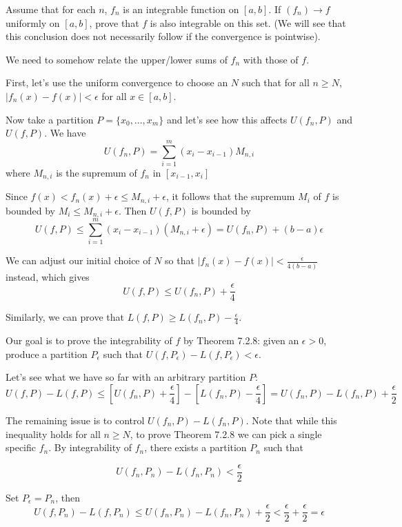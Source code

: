 \documentclass{oxmathproblems}
\begin{document}
\begin{questions}
\miquestion Assume that for each $n$, $f_{n}$ is an integrable function on $[a, b]$. If $(f_{n}) \to f$ uniformly on $[a, b]$, prove that $f$ is also integrable on this set.
(We will see that this conclusion does not necessarily follow if the convergence is pointwise).

\begin{solution}
  We need to somehow relate the upper/lower sums of $f_{n}$ with those of $f$.

  First, let's use the uniform convergence to choose an $N$ such that for all $n \geq N$, $|f_{n}(x)-f(x)| < \epsilon$ for all $x \in [a, b]$.
  
  Now take a partition $P=\{x_{0},...,x_{m}\}$ and let's see how this affects $U(f_{n}, P)$ and $U(f, P)$. We have
  \[U(f_{n}, P) = \sum_{i=1}^{m}(x_{i}-x_{i-1})M_{n, i}\]
  where $M_{n,i}$ is the supremum of $f_{n}$ in $[x_{i-1}, x_{i}]$

  Since $f(x) < f_{n}(x) + \epsilon \leq M_{n, i} + \epsilon$, it follows that the supremum $M_{i}$ of $f$ is bounded by $M_{i} \leq M_{n, i} + \epsilon$.
  Then $U(f, P)$ is bounded by
  \[U(f, P) \leq \sum_{i=1}^{m}(x_{i}-x_{i-1})(M_{n, i} + \epsilon) = U(f_{n}, P) + (b-a)\epsilon\]

  We can adjust our initial choice of $N$ so that $|f_{n}(x)-f(x)| < \frac{\epsilon}{4(b-a)}$ instead, which gives
  \[U(f, P) \leq U(f_{n}, P) + \frac{\epsilon}{4}\]

  Similarly, we can prove that $L(f, P) \geq L(f_{n}, P) - \frac{\epsilon}{4}$.
  
  Our goal is to prove the integrability of $f$ by Theorem 7.2.8: given an $\epsilon > 0$, produce a partition $P_{\epsilon}$ such that
  $U(f, P_{\epsilon}) - L(f, P_{\epsilon}) < \epsilon$.
  
  Let's see what we have so far with an arbitrary partition $P$:
  \[U(f, P) - L(f, P) \leq [U(f_{n}, P) + \frac{\epsilon}{4}] - [L(f_{n}, P) - \frac{\epsilon}{4}] = U(f_{n}, P) - L(f_{n}, P) + \frac{\epsilon}{2}\]

  The remaining issue is to control $U(f_{n}, P) - L(f_{n}, P)$. Note that while this inequality holds for all $n \geq N$, to prove Theorem 7.2.8 we
  can pick a single specific $f_{n}$. By integrability of $f_{n}$, there exists a partition $P_{n}$ such that
  
  \[U(f_{n}, P_{n})-L(f_{n}, P_{n}) < \frac{\epsilon}{2}\]

  Set $P_{\epsilon}=P_{n}$, then
  \[U(f, P_{n}) - L(f, P_{n}) \leq U(f_{n}, P_{n})-L(f_{n}, P_{n}) + \frac{\epsilon}{2} < \frac{\epsilon}{2}+\frac{\epsilon}{2} = \epsilon\]
\end{solution}


\end{questions}
\end{document}

